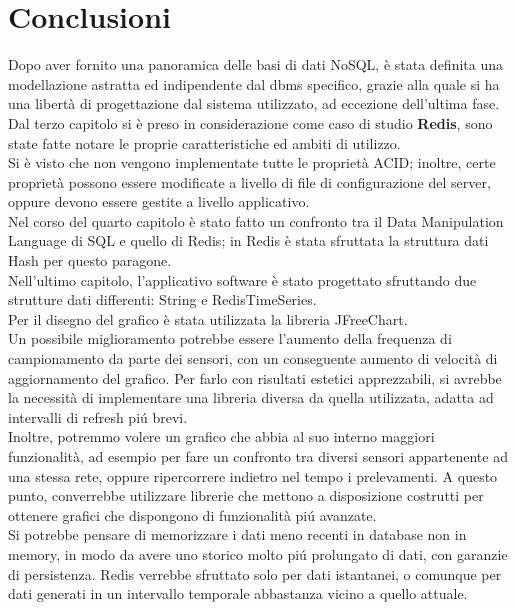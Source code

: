 \chapter{Conclusioni}
Dopo aver fornito una panoramica delle basi di dati NoSQL,
è stata definita una modellazione astratta ed indipendente dal dbms specifico, grazie alla quale si ha una libertà
di progettazione dal sistema utilizzato, ad eccezione dell'ultima fase.\\
Dal terzo capitolo si è preso in considerazione come caso di studio \textbf{Redis}, sono state fatte notare le proprie caratteristiche
ed ambiti di utilizzo.\\
Si è visto che non vengono implementate tutte le proprietà ACID; inoltre, certe proprietà
possono essere modificate a livello di file di configurazione del server, oppure devono essere gestite a livello applicativo.\\
Nel corso del quarto capitolo è stato fatto un confronto tra il Data Manipulation Language di SQL
e quello di Redis;
in Redis è stata sfruttata la struttura dati Hash per questo paragone.\\
Nell'ultimo capitolo, l'applicativo software è stato progettato sfruttando due strutture dati differenti: String e RedisTimeSeries.\\
Per il disegno del grafico è stata utilizzata la libreria JFreeChart.\\
Un possibile miglioramento potrebbe essere l'aumento della frequenza di campionamento da parte dei sensori, con un conseguente aumento di velocità di aggiornamento del grafico.
Per farlo con risultati estetici apprezzabili, si avrebbe la necessità
di implementare una libreria diversa da quella utilizzata, adatta ad intervalli di refresh piú brevi.\\
Inoltre, potremmo volere un grafico che abbia al suo interno maggiori funzionalità, ad esempio per fare un confronto tra diversi sensori appartenente ad una stessa rete, oppure
ripercorrere indietro nel tempo i prelevamenti.
A questo punto, converrebbe utilizzare librerie che mettono a disposizione costrutti per ottenere grafici che dispongono di funzionalità piú avanzate.\\
Si potrebbe pensare di memorizzare i dati meno recenti in database non in memory, in modo da avere uno storico molto piú prolungato di dati, con garanzie di persistenza.
Redis verrebbe sfruttato solo per dati istantanei, o comunque per dati generati in un intervallo temporale abbastanza vicino a quello attuale.\\

